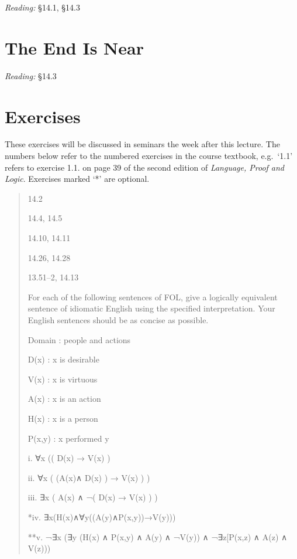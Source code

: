 \documentclass[12pt]{extarticle}
\begin{document}
\begin{multicols*}{3}
\emph{Reading:} §14.1, §14.3
 
 
 
\section{The End Is Near}
 
\emph{Reading:} §14.3
 
\vfill
\begin{minipage}{\columnwidth}
\section{Exercises}
These exercises will be discussed in seminars the week after this lecture.
The numbers below refer to the numbered exercises in the course textbook, e.g.\ `1.1' refers to exercise 1.1. on page 39 of the second edition of \emph{Language, Proof and Logic}. Exercises marked `*' are optional.
 
\begin{quote}
14.2
 
14.4, 14.5
 
14.10, 14.11
 
14.26, 14.28
 
13.51–2, 14.13 %
 
For each of the following sentences of FOL, give a logically equivalent sentence of idiomatic English using the specified interpretation. Your English sentences should be as concise as possible.
 
Domain : people and actions
 
D(x)	: x is desirable
 
V(x)	: x is virtuous
 
A(x)	: x is an action
 
H(x)	: x is a person
 
P(x,y)	: x performed y
 
i.	∀x (( D(x) → V(x) )
 
ii.	∀x ( (A(x)∧ D(x) ) → V(x) ) )
 
iii.	∃x ( A(x) ∧ ¬( D(x) → V(x) ) )
 
*iv. ∃x(H(x)∧∀y((A(y)∧P(x,y))→V(y)))
 
**v. ¬∃x (∃y (H(x) ∧ P(x,y) ∧ A(y) ∧ ¬V(y))	∧ ¬∃z[P(x,z) ∧ A(z) ∧ V(z)))
 
\end{quote}
\end{minipage}
 

\end{multicols*}
\end{document}

